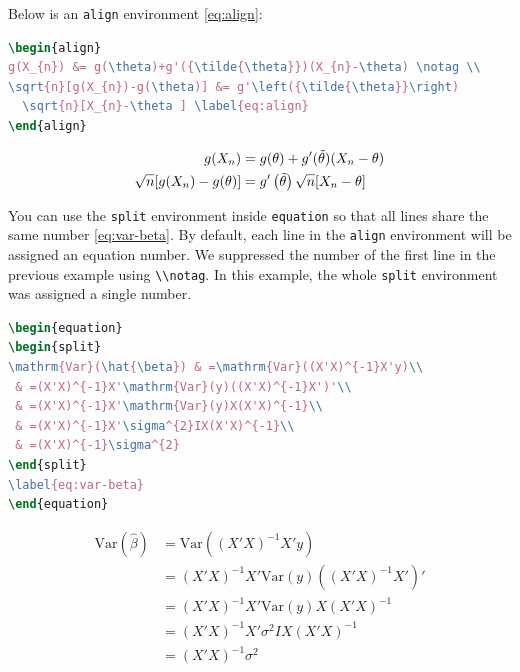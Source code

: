 \documentclass[doctor,openright,twoside]{sjtuthesis}
\newcommand{\passthrough}[1]{#1}
\theoremstyle{plain}
\theoremstyle{definition}
\theoremstyle{remark}
\theoremstyle{ocrenumbox}
\theoremstyle{plain}
\begin{document}
Below is an \passthrough{\lstinline!align!} environment \eqref{eq:align}:

\begin{lstlisting}[language=TeX]
\begin{align} 
g(X_{n}) &= g(\theta)+g'({\tilde{\theta}})(X_{n}-\theta) \notag \\
\sqrt{n}[g(X_{n})-g(\theta)] &= g'\left({\tilde{\theta}}\right)
  \sqrt{n}[X_{n}-\theta ] \label{eq:align}
\end{align} 
\end{lstlisting}

\begin{align}
g(X_{n}) &= g(\theta)+g'({\tilde{\theta}})(X_{n}-\theta) \notag \\
\sqrt{n}[g(X_{n})-g(\theta)] &= g'\left({\tilde{\theta}}\right)
  \sqrt{n}[X_{n}-\theta ] \label{eq:align}
\end{align}

You can use the \passthrough{\lstinline!split!} environment inside
\passthrough{\lstinline!equation!} so that all lines share the same
number \eqref{eq:var-beta}. By default, each line in the
\passthrough{\lstinline!align!} environment will be assigned an equation
number. We suppressed the number of the first line in the previous
example using \passthrough{\lstinline!\\notag!}. In this example, the
whole \passthrough{\lstinline!split!} environment was assigned a single
number.

\begin{lstlisting}[language=TeX]
\begin{equation} 
\begin{split}
\mathrm{Var}(\hat{\beta}) & =\mathrm{Var}((X'X)^{-1}X'y)\\
 & =(X'X)^{-1}X'\mathrm{Var}(y)((X'X)^{-1}X')'\\
 & =(X'X)^{-1}X'\mathrm{Var}(y)X(X'X)^{-1}\\
 & =(X'X)^{-1}X'\sigma^{2}IX(X'X)^{-1}\\
 & =(X'X)^{-1}\sigma^{2}
\end{split}
\label{eq:var-beta}
\end{equation} 
\end{lstlisting}

\begin{equation}
\begin{split}
\mathrm{Var}(\hat{\beta}) & =\mathrm{Var}((X'X)^{-1}X'y)\\
 & =(X'X)^{-1}X'\mathrm{Var}(y)((X'X)^{-1}X')'\\
 & =(X'X)^{-1}X'\mathrm{Var}(y)X(X'X)^{-1}\\
 & =(X'X)^{-1}X'\sigma^{2}IX(X'X)^{-1}\\
 & =(X'X)^{-1}\sigma^{2}
\end{split}
\label{eq:var-beta}
\end{equation}
\end{document}
